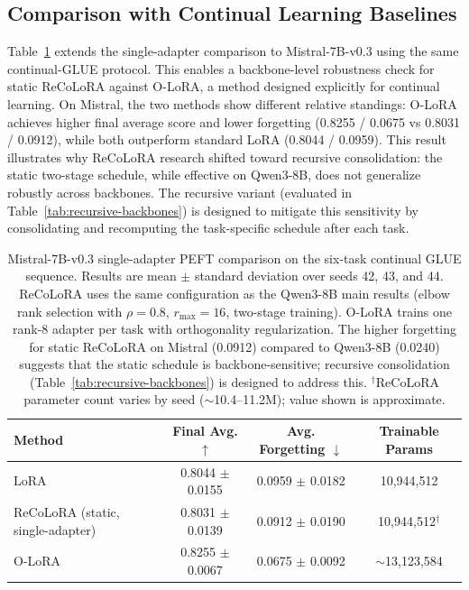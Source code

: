 \documentclass[11pt]{article}
\begin{document}
\subsection{Comparison with Continual Learning Baselines}
Table~\ref{tab:mistral-single} extends the single-adapter comparison to Mistral-7B-v0.3 using the same continual-GLUE protocol. This enables a backbone-level robustness check for static ReCoLoRA against O-LoRA, a method designed explicitly for continual learning. On Mistral, the two methods show different relative standings: O-LoRA achieves higher final average score and lower forgetting (0.8255 / 0.0675 vs 0.8031 / 0.0912), while both outperform standard LoRA (0.8044 / 0.0959). This result illustrates why ReCoLoRA research shifted toward recursive consolidation: the static two-stage schedule, while effective on Qwen3-8B, does not generalize robustly across backbones. The recursive variant (evaluated in Table~\ref{tab:recursive-backbones}) is designed to mitigate this sensitivity by consolidating and recomputing the task-specific schedule after each task.

\begin{table}[t]
\centering
\begin{tabular}{lccc}
\toprule
Method & Final Avg. $\uparrow$ & Avg. Forgetting $\downarrow$ & Trainable Params \\
\midrule
LoRA & 0.8044 $\pm$ 0.0155 & 0.0959 $\pm$ 0.0182 & 10,944,512 \\
ReCoLoRA (static, single-adapter) & 0.8031 $\pm$ 0.0139 & 0.0912 $\pm$ 0.0190 & 10,944,512$^{\dagger}$ \\
O-LoRA & 0.8255 $\pm$ 0.0067 & 0.0675 $\pm$ 0.0092 & $\sim$13,123,584 \\
\bottomrule
\end{tabular}
\caption{Mistral-7B-v0.3 single-adapter PEFT comparison on the six-task continual GLUE sequence. Results are mean $\pm$ standard deviation over seeds 42, 43, and 44. ReCoLoRA uses the same configuration as the Qwen3-8B main results (elbow rank selection with $\rho=0.8$, $r_{\max}=16$, two-stage training). O-LoRA trains one rank-8 adapter per task with orthogonality regularization. The higher forgetting for static ReCoLoRA on Mistral (0.0912) compared to Qwen3-8B (0.0240) suggests that the static schedule is backbone-sensitive; recursive consolidation (Table~\ref{tab:recursive-backbones}) is designed to address this. $^{\dagger}$ReCoLoRA parameter count varies by seed ($\sim$10.4--11.2M); value shown is approximate.}
\label{tab:mistral-single}
\end{table}
\end{document}
